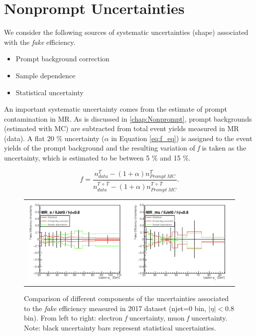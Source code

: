 \section{Nonprompt Uncertainties}
\label{sec:NonUnc}

We consider the following sources of systematic uncertainties (shape) associated with the \emph{fake} efficiency.

\begin{itemize}
\item Prompt background correction
\item Sample dependence 
\item Statistical uncertainty 
\end{itemize}

An important systematic uncertainty comes from the estimate of prompt contamination in MR. As is discussed in \autoref{chap:Nonprompt}, prompt backgrounds (estimated with MC) are subtracted from total event yields measured in MR (data). A flat 20 $\%$ uncertainty ($\alpha$ in Equation \ref{eq:f_eq}) is assigned to the event yields of the prompt background and the resulting variation of \emph{f} is taken as the uncertainty, which is estimated to be between 5 $\%$ and 15 $\%$.

\begin{equation}
f=\frac{n_{data}^{T}-(1+\alpha)n_{Prompt~MC}^{T}}{n_{data}^{T+\overline{T}}-(1+\alpha)n_{Prompt~MC}^{T+\overline{T}}}.
\label{eq:f_eq}
\end{equation}  

\begin{figure}[tbh!]
 \begin{center}
 \begin{tabular}{c}
 \includegraphics[width=0.99\textwidth]{figures/Part3/Systematics/MR1}
 \end{tabular}
 \caption{Comparison of different components of the uncertainties associated to the \emph{fake} efficiency measured in 2017 dataset (njet=0 bin, $|\eta|<$0.8 bin). From left to right: electron \emph{f} uncertainty, muon \emph{f} uncertainty. Note: black uncertainty bars represent statistical uncertainties.}
 \label{fig:f_comp1}
 \end{center}
\end{figure}

